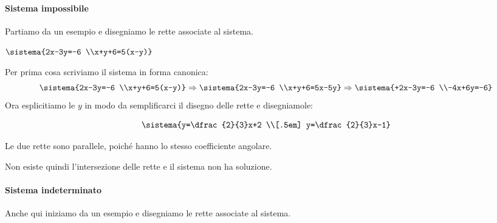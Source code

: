 \paragraph{Sistema impossibile}

Partiamo da un esempio e disegniamo le rette associate al sistema.

 \begin{esempio}
\(\sistema{2x-3y=-6 \\x+y+6=5(x-y)}\)
\vspace{1em}

Per prima cosa scriviamo il sistema in forma canonica:
\[
\sistema{2x-3y=-6 \\x+y+6=5(x-y)}\Rightarrow
\sistema{2x-3y=-6 \\x+y+6=5x-5y}\Rightarrow
\sistema{+2x-3y=-6 \\-4x+6y=-6}
\]
Ora esplicitiamo le \(y\) in modo da semplificarci il disegno delle rette e 
disegniamole:

\begin{minipage}{.48\textwidth}
\[\sistema{y=\dfrac{2}{3}x+2 \\[.5em] y=\dfrac{2}{3}x-1}\]

Le due rette sono parallele, poiché hanno lo stesso coefficiente angolare. 

Non esiste quindi l'intersezione delle rette e il sistema non ha soluzione.
\end{minipage}
\hfill
\begin{minipage}{.48\textwidth}
\begin{center}
\end{center}
\end{minipage}

\end{esempio}

\paragraph{Sistema indeterminato}

Anche qui iniziamo da un esempio e disegniamo le rette associate al sistema.


